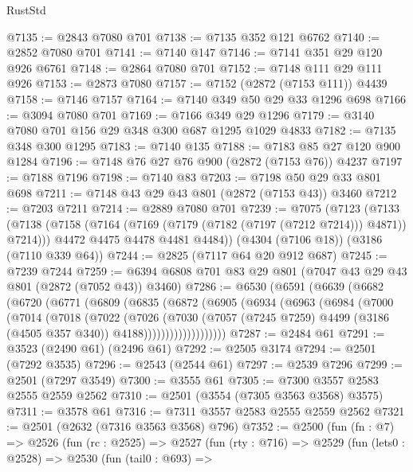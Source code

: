 \begin{lexlean}{RustStd}
\begin{coremodule}
@7135 := @2843 @7080 @701
@7138 := @7135 @352 @121 @6762
@7140 := @2852 @7080 @701
@7141 := @7140 @147
@7146 := @7141 @351 @29 @120 @926 @6761
@7148 := @2864 @7080 @701
@7152 := @7148 @111 @29 @111 @926
@7153 := @2873 @7080
@7157 := @7152 (@2872 (@7153 @111)) @4439
@7158 := @7146 @7157
@7164 := @7140 @349 @50 @29 @33 @1296 @698
@7166 := @3094 @7080 @701
@7169 := @7166 @349 @29 @1296
@7179 := @3140 @7080 @701 @156 @29 @348 @300 @687 @1295 @1029 @4833
@7182 := @7135 @348 @300 @1295
@7183 := @7140 @135
@7188 := @7183 @85 @27 @120 @900 @1284
@7196 := @7148 @76 @27 @76 @900 (@2872 (@7153 @76)) @4237
@7197 := @7188 @7196
@7198 := @7140 @83
@7203 := @7198 @50 @29 @33 @801 @698
@7211 := @7148 @43 @29 @43 @801 (@2872 (@7153 @43)) @3460
@7212 := @7203 @7211
@7214 := @2889 @7080 @701
@7239 := @7075
    (@7123
      (@7133
        (@7138 (@7158 (@7164 (@7169 (@7179 (@7182 (@7197 (@7212 @7214))) @4871)) @7214)))
        @4472
        @4475
        @4478
        @4481
        @4484))
    (@4304 (@7106 @18))
    (@3186 (@7110 @339 @64))
@7244 := @2825 (@7117 @64 @20 @912 @687)
@7245 := @7239 @7244
@7259 := @6394 @6808 @701 @83 @29 @801 (@7047 @43 @29 @43 @801 (@2872 (@7052 @43)) @3460)
@7286 := @6530
    (@6591
      (@6639
        (@6682
          (@6720
            (@6771
              (@6809
                (@6835
                  (@6872
                    (@6905
                      (@6934
                        (@6963
                          (@6984
                            (@7000
                              (@7014
                                (@7018
                                  (@7022
                                    (@7026
                                      (@7030
                                        (@7057
                                          (@7245 @7259)
                                          @4499
                                          (@3186 (@4505 @357 @340))
                                          @4188)))))))))))))))))))
@7287 := @2484 @61
@7291 := @3523 (@2490 @61) (@2496 @61)
@7292 := @2505 @3174
@7294 := @2501 (@7292 @3535)
@7296 := @2543 (@2544 @61)
@7297 := @2539 @7296
@7299 := @2501 (@7297 @3549)
@7300 := @3555 @61
@7305 := @7300 @3557 @2583 @2555 @2559 @2562
@7310 := @2501 (@3554 (@7305 @3563 @3568) @3575)
@7311 := @3578 @61
@7316 := @7311 @3557 @2583 @2555 @2559 @2562
@7321 := @2501 (@2632 (@7316 @3563 @3568) @796)
@7352 := @2500
    (fun (fn : @7) =>
    @2526
      (fun (rc : @2525) =>
      @2527
        (fun (rty : @716) =>
        @2529
          (fun (lets0 : @2528) =>
          @2530
            (fun (tail0 : @693) =>

\end{coremodule}
\end{lexlean}
